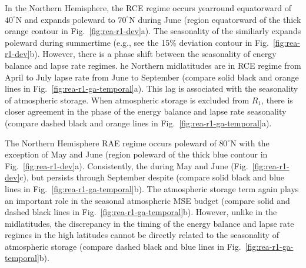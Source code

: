 \documentclass{ametsocV5}
\begin{document}
    In the Northern Hemisphere, the RCE regime occurs yearround equatorward of $40^\circ$N and expands poleward to $70^\circ$N during June (region equatorward of the thick orange contour in Fig.~\ref{fig:rea-r1-dev}a). The seasonality of the  similiarly expands poleward during summertime (e.g., see the 15\% deviation contour in Fig.~\ref{fig:rea-r1-dev}b). However, there is a phase shift between the seasonality of energy balance and lapse rate regimes. he Northern midlatitudes are in  RCE regime from April to July lapse rate  from June to September (compare solid black and orange lines in Fig.~\ref{fig:rea-r1-ga-temporal}a). This lag is associated with the seasonality of atmospheric storage. When atmospheric storage is excluded from $R_1$, there is closer agreement in the phase of the energy balance and lapse rate seasonality (compare dashed black and orange lines in Fig.~\ref{fig:rea-r1-ga-temporal}a).

    The Northern Hemisphere RAE regime occurs poleward of $80^\circ$N with the exception of May and June (region poleward of the thick blue contour in Fig.~\ref{fig:rea-r1-dev}a). Consistently, the  during May and June (Fig.~\ref{fig:rea-r1-dev}c), but persists through September despite  (compare solid black and blue lines in Fig.~\ref{fig:rea-r1-ga-temporal}b). The atmospheric storage term again plays an important role in the seasonal atmospheric MSE budget (compare solid and dashed black lines in Fig.~\ref{fig:rea-r1-ga-temporal}b). However, unlike in the midlatitudes, the discrepancy in the timing of the energy balance and lapse rate regimes in the high latitudes cannot be directly related to the seasonality of atmospheric storage (compare dashed black and blue lines in Fig.~\ref{fig:rea-r1-ga-temporal}b).

\end{document}
